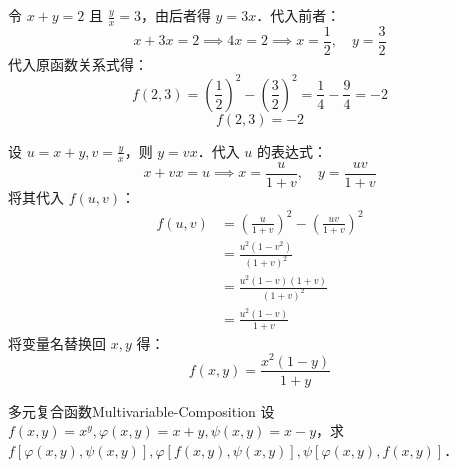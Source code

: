 \begin{solution}
    令 $x + y = 2$ 且 $\frac{y}{x} = 3$，由后者得 $y = 3x$．代入前者：
    \begin{equation}
        x + 3x = 2 \implies 4x = 2 \implies x = \frac{1}{2}, \quad y = \frac{3}{2}
    \end{equation}
    代入原函数关系式得：
    \begin{equation}
        f(2, 3) = \left( \frac{1}{2} \right)^2 - \left( \frac{3}{2} \right)^2 = \frac{1}{4} - \frac{9}{4} = -2
    \end{equation}
    \begin{equation}
        \boxed{f(2, 3) = -2}
    \end{equation}

    设 $u = x + y, v = \frac{y}{x}$，则 $y = vx$．代入 $u$ 的表达式：
    \begin{equation}
        x + vx = u \implies x = \frac{u}{1+v}, \quad y = \frac{uv}{1+v}
    \end{equation}
    将其代入 $f(u, v)$：
    \begin{equation}
        \begin{aligned}
            f(u, v) & = \left( \frac{u}{1+v} \right)^2 - \left( \frac{uv}{1+v} \right)^2 \\
                    & = \frac{u^2(1 - v^2)}{(1+v)^2}                                     \\
                    & = \frac{u^2(1-v)(1+v)}{(1+v)^2}                                    \\
                    & = \frac{u^2(1-v)}{1+v}
        \end{aligned}
    \end{equation}
    将变量名替换回 $x, y$ 得：
    \begin{equation}
        \boxed{f(x, y) = \frac{x^2(1-y)}{1+y}}
    \end{equation}
\end{solution}

\begin{problem}{多元复合函数}{Multivariable-Composition}
    设 $f(x, y) = x^y, \varphi(x, y) = x + y, \psi(x, y) = x - y$，求 $f[\varphi(x, y), \psi(x, y)], \varphi[f(x, y), \psi(x, y)], \psi[\varphi(x, y), f(x, y)]$．
\end{problem}

